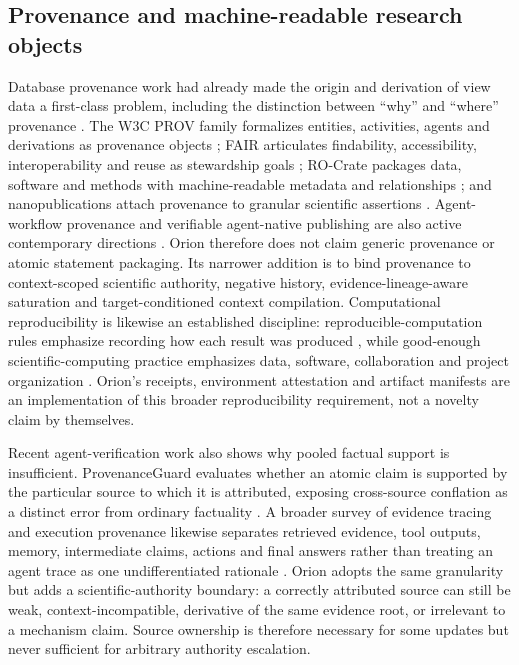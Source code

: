 \subsection{Provenance and machine-readable research objects}
Database provenance work had already made the origin and derivation of view data a first-class problem, including the distinction between ``why'' and ``where'' provenance \cite{buneman2001}. The W3C PROV family formalizes entities, activities, agents and derivations as provenance objects \cite{moreau2013}; FAIR articulates findability, accessibility, interoperability and reuse as stewardship goals \cite{wilkinson2016}; RO-Crate packages data, software and methods with machine-readable metadata and relationships \cite{soilandreyes2022}; and nanopublications attach provenance to granular scientific assertions \cite{kuhn2018}. Agent-workflow provenance and verifiable agent-native publishing are also active contemporary directions \cite{souza2025,dogah2026}. Orion therefore does not claim generic provenance or atomic statement packaging. Its narrower addition is to bind provenance to context-scoped scientific authority, negative history, evidence-lineage-aware saturation and target-conditioned context compilation. Computational reproducibility is likewise an established discipline: reproducible-computation rules emphasize recording how each result was produced \cite{sandve2013}, while good-enough scientific-computing practice emphasizes data, software, collaboration and project organization \cite{wilson2017}. Orion's receipts, environment attestation and artifact manifests are an implementation of this broader reproducibility requirement, not a novelty claim by themselves.

Recent agent-verification work also shows why pooled factual support is insufficient. ProvenanceGuard evaluates whether an atomic claim is supported by the particular source to which it is attributed, exposing cross-source conflation as a distinct error from ordinary factuality \cite{alvarez2026provenanceguard}. A broader survey of evidence tracing and execution provenance likewise separates retrieved evidence, tool outputs, memory, intermediate claims, actions and final answers rather than treating an agent trace as one undifferentiated rationale \cite{wang2026traces}. Orion adopts the same granularity but adds a scientific-authority boundary: a correctly attributed source can still be weak, context-incompatible, derivative of the same evidence root, or irrelevant to a mechanism claim. Source ownership is therefore necessary for some updates but never sufficient for arbitrary authority escalation.

